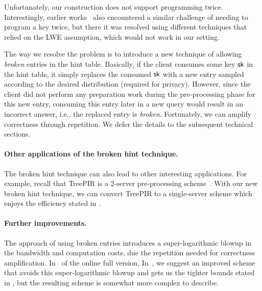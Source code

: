 Unfortunately, our \ppps construction does not support programming twice.
Interestingly, 
earlier works~\cite{pir-ec23,lazza-pir}
also encountered a similar challenge of needing
to program a key twice, but there it was resolved
using different techniques that relied on the LWE 
assumption, which would not work in our setting.

The way we resolve the problem is to introduce
a new technique of allowing {\it broken} entries
in the hint table.
Basically, if the client consumes some \ppps key $\mathsf{sk}$ in the hint table,
it simply replaces the consumed $\mathsf{sk}$ with  
a new entry sampled according to the desired 
distribution (required for privacy). 
However, %
since the client did not perform any preparation work
during the pre-processing phase
for this new entry, 
consuming this entry 
later in a new query 
would result in an incorrect answer, i.e., the replaced entry is {\it broken}.
Fortunately, we can amplify correctness 
through repetition. We defer the details to the subsequent 
technical sections.


\paragraph{Other applications of the broken hint technique.}
The broken hint technique can also lead to other interesting applications.
For example, recall that TreePIR is a 
2-server pre-processing scheme~\cite{treepir}.
With our new broken hint technique, we can convert
TreePIR to a single-server scheme which enjoys the efficiency stated
in .



\paragraph{Further improvements.}
The approach of using broken entries 
introduces a super-logarithmic blowup in the 
bandwidth and computation costs, due the repetition needed
for correctness amplification.
\ifnum{}
In~ of the online full version,
\else
In~,
\fi
we suggest an improved scheme
that avoids this 
super-logarithmic blowup and gets us the tighter
bounds stated in , but 
the resulting scheme is somewhat more complex to describe.







